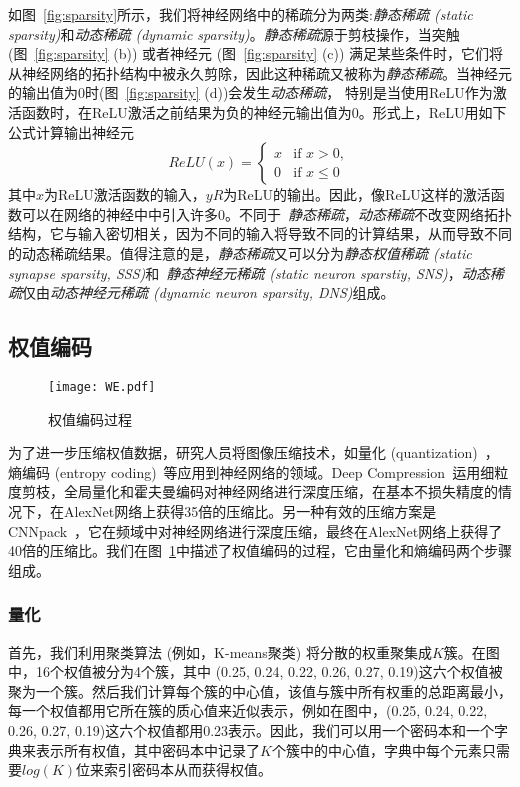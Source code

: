 如图~\ref{fig:sparsity}所示，我们将神经网络中的稀疏分为两类:\emph{静态稀疏 (static sparsity)}和\emph{动态稀疏 (dynamic sparsity)}。\emph{静态稀疏}源于剪枝操作，当突触 (图~\ref{fig:sparsity} (b)) 或者神经元 (图~\ref{fig:sparsity} (c)) 满足某些条件时，它们将从神经网络的拓扑结构中被永久剪除，因此这种稀疏又被称为\emph{静态稀疏}。当神经元的输出值为$0$时(图~\ref{fig:sparsity} (d))会发生\emph{动态稀疏}， 特别是当使用ReLU作为激活函数时，在ReLU激活之前结果为负的神经元输出值为$0$。形式上，ReLU用如下公式计算输出神经元
\begin{equation}
ReLU(x)=
\begin{cases}
x & \text{if } x > 0, \\
0 & \text{if } x \leq 0
\end{cases}
\end{equation}
其中$x$为ReLU激活函数的输入，$yR$为ReLU的输出。因此，像ReLU这样的激活函数可以在网络的神经中中引入许多$0$。不同于~\emph{静态稀疏}，\emph{动态稀疏}不改变网络拓扑结构，它与输入密切相关，因为不同的输入将导致不同的计算结果，从而导致不同的动态稀疏结果。值得注意的是，\emph{静态稀疏}又可以分为\emph{静态权值稀疏 (static synapse sparsity, SSS)}和~\emph{静态神经元稀疏 (static neuron sparstiy, SNS)}，\emph{动态稀疏}仅由\emph{动态神经元稀疏 (dynamic neuron sparsity, DNS)}组成。

\subsection{权值编码}

\begin{figure}[h]
\centering
\texttt{[image: WE.pdf]}
\caption{权值编码过程}
\label{fig:weight_encoding}
\end{figure}

为了进一步压缩权值数据，研究人员将图像压缩技术，如量化 (quantization)~\cite{henneaux1992quantization}，熵编码 (entropy coding)~\cite{mackay2003information}等应用到神经网络的领域。Deep Compression~\cite{han2015deep}运用细粒度剪枝，全局量化和霍夫曼编码对神经网络进行深度压缩，在基本不损失精度的情况下，在AlexNet网络上获得35倍的压缩比。另一种有效的压缩方案是CNNpack~\cite{wang2016cnnpack}，它在频域中对神经网络进行深度压缩，最终在AlexNet网络上获得了40倍的压缩比。我们在图~\ref{fig:weight_encoding}中描述了权值编码的过程，它由量化和熵编码两个步骤组成。

\subsubsection{量化}
首先，我们利用聚类算法 (例如，K-means聚类) 将分散的权重聚集成$K$簇。在图中，16个权值被分为4个簇，其中 (0.25, 0.24, 0.22, 0.26, 0.27, 0.19)这六个权值被聚为一个簇。然后我们计算每个簇的中心值，该值与簇中所有权重的总距离最小，每一个权值都用它所在簇的质心值来近似表示，例如在图中，(0.25, 0.24, 0.22, 0.26, 0.27, 0.19)这六个权值都用0.23表示。因此，我们可以用一个密码本和一个字典来表示所有权值，其中密码本中记录了$K$个簇中的中心值，字典中每个元素只需要$log(K)$位来索引密码本从而获得权值。

